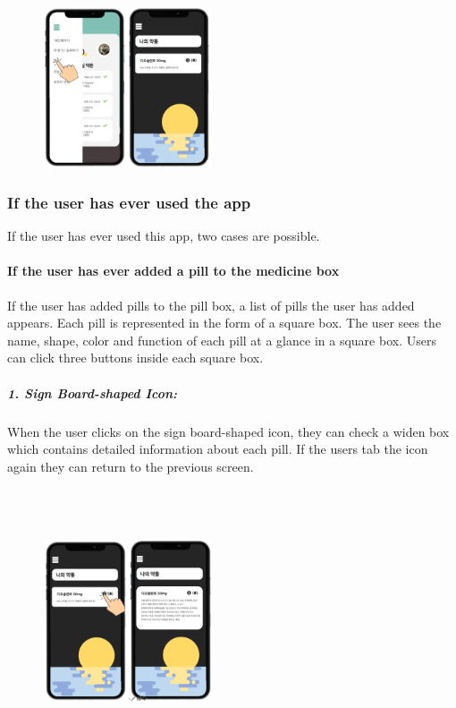 \documentclass[conference]{IEEEtran}
\begin{document}
\begin{figure}[h!]
\centering
\includegraphics[width=5cm]{final_image_folder/click_pillbox.png}
\caption{}
\label{fig:map}
\end{figure}

\subsubsection{If the user has ever used the app}
If the user has ever used this app, two cases are possible.\\

\paragraph{If the user has ever added a pill to the medicine box}
If the user has added pills to the pill box, a list of pills the user has added appears. Each pill is represented in the form of a square box. The user sees the name, shape, color and function of each pill at a glance in a square box. Users can click three buttons inside each square box.\\

\subparagraph{1. Sign Board-shaped Icon:}
When the user clicks on the sign board-shaped icon, they can check a widen box which contains detailed information about each pill. If the users tab the icon again they can return to the previous screen.\\
\\
\\
\\
\begin{figure}[t!]
\centering
\includegraphics[width=5cm]{final_image_folder/click_pillbox_info.png}
\caption{}
\label{fig:map}
\end{figure}
\end{document}
